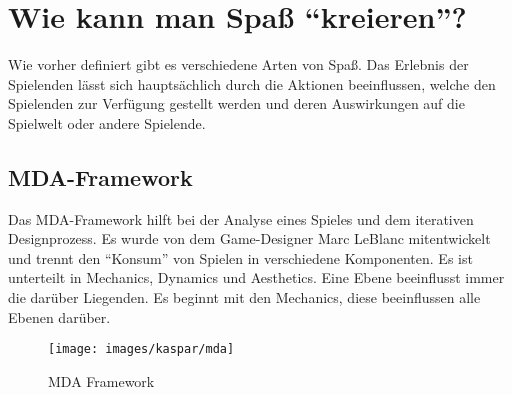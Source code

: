 \section{Wie kann man Spaß "`kreieren"'?}

Wie vorher definiert gibt es verschiedene Arten von Spaß. Das Erlebnis der Spielenden lässt sich hauptsächlich durch die Aktionen beeinflussen, welche den Spielenden zur Verfügung gestellt werden und deren Auswirkungen auf die Spielwelt oder andere Spielende.

\subsection{MDA-Framework}

Das MDA-Framework hilft bei der Analyse eines Spieles und dem iterativen Designprozess. Es wurde von dem Game-Designer Marc LeBlanc mitentwickelt und trennt den "`Konsum"' von Spielen in verschiedene Komponenten\cite{_mda}. Es ist unterteilt in Mechanics, Dynamics und Aesthetics. Eine Ebene beeinflusst immer die darüber Liegenden. Es beginnt mit den Mechanics, diese beeinflussen alle Ebenen darüber.

\begin{figure}[H]
	\centering
	\texttt{[image: images/kaspar/mda]}
	\caption{MDA Framework\cite{_mda}}
\end{figure}

